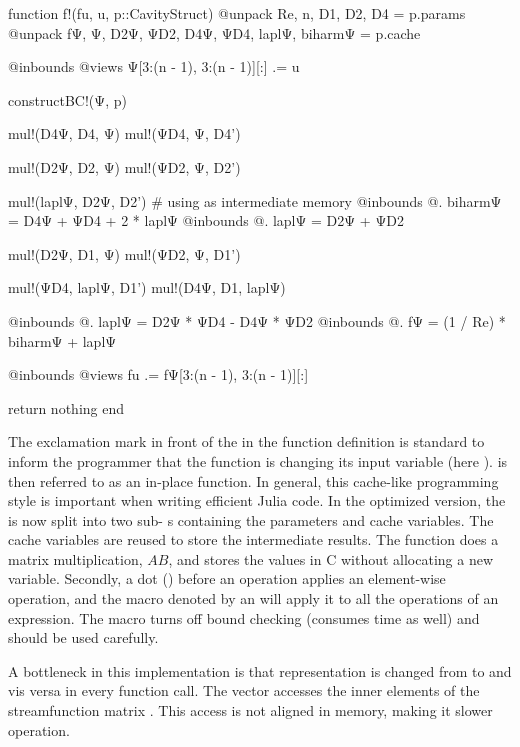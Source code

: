 \begin{jllisting}[caption=Optimized implementation in Julia of the nonlinear
  function $F$ \vspace{4pt},float]
function f!(fu, u, p::CavityStruct)
    @unpack Re, n, D1, D2, D4 = p.params
    @unpack fΨ, Ψ, D2Ψ, ΨD2, D4Ψ, ΨD4, laplΨ, biharmΨ = p.cache

    @inbounds @views Ψ[3:(n - 1), 3:(n - 1)][:] .= u

    constructBC!(Ψ, p)

    mul!(D4Ψ, D4, Ψ)
    mul!(ΨD4, Ψ, D4')

    mul!(D2Ψ, D2, Ψ)
    mul!(ΨD2, Ψ, D2')

    mul!(laplΨ, D2Ψ, D2') # using as intermediate memory
    @inbounds @. biharmΨ = D4Ψ + ΨD4 + 2 * laplΨ
    @inbounds @. laplΨ = D2Ψ + ΨD2

    mul!(D2Ψ, D1, Ψ)
    mul!(ΨD2, Ψ, D1')

    mul!(ΨD4, laplΨ, D1')
    mul!(D4Ψ, D1, laplΨ)

    @inbounds @. laplΨ = D2Ψ * ΨD4 - D4Ψ * ΨD2
    @inbounds @. fΨ = (1 / Re) * biharmΨ + laplΨ

    @inbounds @views fu .= fΨ[3:(n - 1), 3:(n - 1)][:]

    return nothing
end
\end{jllisting}

The exclamation mark in front of the  in the function definition is
standard to inform the programmer that the function is changing its input
variable (here ).  is then referred to as an
in-place function. In general, this cache-like programming style is important
when writing efficient Julia code.
In the optimized version, the  is now split into two sub- s containing the parameters and
cache variables. The cache variables are reused to store the intermediate
results. The  function does a matrix multiplication, $AB$,
and stores the values in C without allocating a new variable. Secondly, a dot
() before an operation applies an element-wise operation, and the
macro denoted by an  will apply it to all the operations of an
expression. The  macro turns off bound checking (consumes time
as well) and should be used carefully.

A bottleneck in this implementation is that representation is changed from
 to  and vis versa in every function call. The vector
 accesses the inner elements of the streamfunction matrix .
This access is not aligned in memory, making it slower operation. \\

